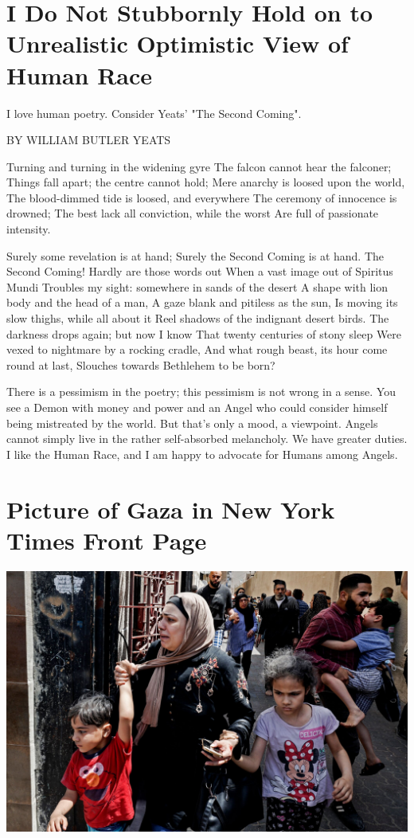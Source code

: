 \documentclass{amsart}
\begin{document}
\section{I Do Not Stubbornly Hold on to Unrealistic Optimistic View of Human Race}

I love human poetry.  Consider Yeats' "The Second Coming".

BY WILLIAM BUTLER YEATS

Turning and turning in the widening gyre   
The falcon cannot hear the falconer;
Things fall apart; the centre cannot hold;
Mere anarchy is loosed upon the world,
The blood-dimmed tide is loosed, and everywhere   
The ceremony of innocence is drowned;
The best lack all conviction, while the worst   
Are full of passionate intensity.

Surely some revelation is at hand;
Surely the Second Coming is at hand.   
The Second Coming! Hardly are those words out   
When a vast image out of Spiritus Mundi
Troubles my sight: somewhere in sands of the desert   
A shape with lion body and the head of a man,   
A gaze blank and pitiless as the sun,   
Is moving its slow thighs, while all about it   
Reel shadows of the indignant desert birds.   
The darkness drops again; but now I know   
That twenty centuries of stony sleep
Were vexed to nightmare by a rocking cradle,   
And what rough beast, its hour come round at last,   
Slouches towards Bethlehem to be born?


There is a pessimism in the poetry; this pessimism is not wrong in a sense.  You see a Demon with money and power and an Angel who could consider himself being mistreated by the world.  But that's only a mood, a viewpoint.  Angels cannot simply live in the rather self-absorbed melancholy.  We have greater duties.  I like the Human Race, and I am happy to advocate for Humans among Angels.

\section{Picture of Gaza in New York Times Front Page}

\includegraphics[scale=0.7]{gaza-may-11-2021.jpeg}
\end{document}
